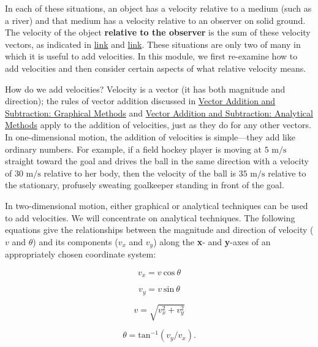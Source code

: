 \documentclass[
]{book}
\begin{document}
In each of these situations, an object has a
\protect\hypertarget{import-auto-id1831655}{}{velocity} relative to a medium
(such as a river) and that medium has a velocity relative to an observer
on solid ground. The velocity of the object \textbf{relative to the observer}
is the sum of these velocity vectors, as indicated in
\protect\hyperlink{import-auto-id1635451}{link} and
\protect\hyperlink{import-auto-id1851600}{link}. These situations
are only two of many in which it is useful to add velocities. In this
module, we first re-examine how to add velocities and then consider
certain aspects of what relative velocity means.

How do we add velocities? Velocity is a vector (it has both magnitude
and direction); the rules of \protect\hypertarget{import-auto-id1402169}{}{vector addition} discussed in \href{/m54781}{Vector Addition and Subtraction:
Graphical Methods} and \href{/m54783}{Vector Addition and Subtraction:
Analytical Methods} apply to the addition of velocities, just
as they do for any other vectors. In one-dimensional motion, the
addition of velocities is simple---they add like ordinary numbers. For
example, if a field hockey player is moving at \(\text{5~m/s}{}\) straight
toward the goal and drives the ball in the same direction with a
velocity of \(\text{30~m/s}{}\) relative to her body, then the velocity of
the ball is \(\text{35~m/s}{}\) relative to the stationary, profusely
sweating goalkeeper standing in front of the goal.

In two-dimensional motion, either graphical or analytical techniques can
be used to add velocities. We will concentrate on analytical techniques.
The following equations give the relationships between the magnitude and
direction of velocity (\(v{}\) and \(\theta{}\)) and its components
(\(v_{x}{}\) and \(v_{y}{}\)) along the \textbf{x}- and \textbf{y}-axes of an
appropriately chosen coordinate system:

\leavevmode{}%
\[{{v_{x} = v}\ \text{cos}\ \theta}{}\]

\leavevmode{}%
\[{{v_{y} = v\ }\text{sin}\ \theta}{}\]

\leavevmode{}%
\[{v = \sqrt{v_{x}^{2} + v_{y}^{2}}}{}\]

\leavevmode{}%
\[{{\theta = \text{tan}^{- 1}}({v_{y}/v_{x}})}.{}\]
\end{document}
